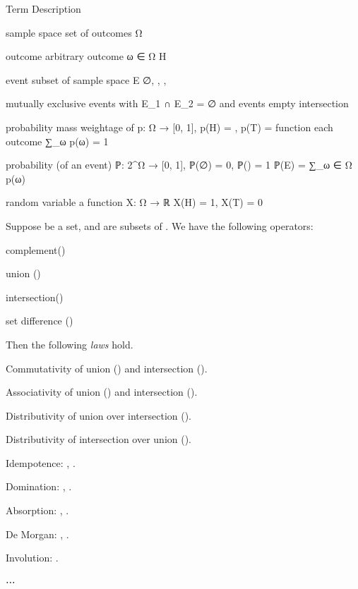 \startchapter [title={Discrete Probability Spaces}]

	\setuptabulate [
		split=yes,
		header=text,
		frame=on,
		title={\tfa Notations}]

	\starttabulate [|l|l|M|m|]
		\FL  \FL
		\NC  Term  \NC  Description  \NC  {}  \NC  {}  \NR
		\ML  \ML

		\NC  sample space  \NC  set of outcomes  \NC  Ω  \NC  \bcrl[H, T]  \NR  \ML

		\NC  outcome  \NC  arbitrary outcome  \NC  ω ∈ Ω  \NC  H  \NR  \ML

		\NC  event  \NC  subset of sample space  \NC  E  \NC  ∅, \bcrl[H], \bcrl[T], \bcrl[H, T]  \NR  \ML

		\NC  mutually exclusive  \NC  events with  \NC  E_1 ∩ E_2 = ∅  \NC  \bcrl[H] and \bcrl[T]  \NR
		\NC  events  \NC  empty intersection  \NC  \NC  \NR  \ML

		\NC  probability mass  \NC  weightage of  \NC  p: Ω → [0, 1],   \NC  p(H) = , p(T) =   \NR
		\NC  function  \NC   each outcome  \NC  ∑_ω p(ω) = 1  \NC  \NR  \ML

		\NC  probability  \NC  (of an event)  \NC  ℙ: 2^Ω → [0, 1],  \NC  ℙ(∅) = 0, ℙ(\bcrl[H, T]) = 1  \NR
		\NC  \NC  \NC  ℙ(E) = ∑_{ω ∈ Ω} p(ω)  \NC  \NR  \ML

		\NC  random variable  \NC  a function  \NC  X: Ω → ℝ  \NC  X(H) = 1, X(T) = 0  \NR  \ML
		\BL
	\stoptabulate

\stopchapter


\startchapter [title={The algebra of sets}]
	
	Suppose  be a set, and  are subsets of . We have the following operators:
	\startitemize [1, joinedup]
		\item  complement()
		\item  union ()
		\item  intersection()
		\item  set difference ()
	\stopitemize

	Then the following \emph{laws} hold.
	\startitemize [1, joinedup]
		\item  Commutativity of union () and intersection ().
		\item  Associativity of union () and intersection ().
		\item  Distributivity of union over intersection ().
		\item  Distributivity of intersection over union ().
		\item  Idempotence: , .
		\item  Domination: , .
		\item  Absorption: , .
		\item  De Morgan: , .
		\item  Involution: .
		\item  ⋯
	\stopitemize
	
